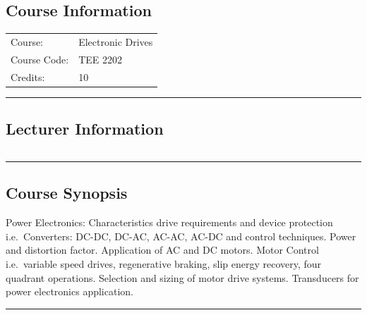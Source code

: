 
\subsection*{Course Information}
\vspace{0ex}%
\noindent\parbox{0.5\textwidth}{%
    \noindent\begin{tabular}{@{}ll}
                 \textsf{Course:}          & 	Electronic Drives \\
                 \textsf{Course Code:}         & 	TEE 2202    \\
                 \textsf{Credits:}    & 	10
    \end{tabular}}
\vspace{2ex}\hrule\vspace{2ex}

\subsection*{Lecturer Information}
\noindent\parbox{0.5\textwidth}{%
    \noindent\begin{tabular}{@{}ll}
                 
    \end{tabular}}
\vspace{2ex}\hrule\vspace{2ex}


\subsection*{Course Synopsis}
Power Electronics: Characteristics drive requirements and device protection i.e.\ Converters: DC-DC, DC-AC, AC-AC, AC-DC and control techniques.
Power and distortion factor.
Application of AC and DC motors.
Motor Control i.e.\ variable speed drives, regenerative braking, slip energy recovery, four quadrant operations. Selection and sizing of motor drive systems.
Transducers for power electronics application.
\vspace{2ex} \hrule\vspace{2ex}

